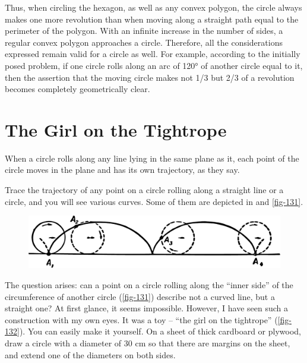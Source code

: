Thus, when circling the hexagon, as well as any convex polygon, the circle always makes one more revolution than when moving along a straight path equal to the perimeter of the polygon. With an infinite increase in the number of sides, a regular convex polygon approaches a circle. Therefore, all the considerations expressed remain valid for a circle as well. For example, according to the initially posed problem, if one circle rolls along an arc of \ang{120} of another circle equal to it, then the assertion that the moving circle makes not 1/3 but 2/3 of a revolution becomes completely geometrically clear.


\section{The Girl on the Tightrope}
\label{sec-9.11}


When a circle rolls along any line lying in the same plane as it, each point of the circle moves in the plane and has its own trajectory, as they say.

Trace the trajectory of any point on a circle rolling along a straight line or a circle, and you will see various curves. Some of them are depicted in  and \ref{fig-131}.

\begin{figure}[h!]
\centering
\includegraphics[width=\textwidth]{figures/ch-09/fig-130.pdf}
\end{figure}


The question arises: can a point on a circle rolling along the ``inner side'' of the circumference of another circle (\ref{fig-131}) describe not a curved line, but a straight one? At first glance, it seems impossible. However, I have seen such a construction with my own eyes. It was a toy -- ``the girl on the tightrope'' (\ref{fig-132}). You can easily make it yourself. On a sheet of thick cardboard or plywood, draw a circle with a diameter of 30 cm so that there are margins on the sheet, and extend one of the diameters on both sides.

